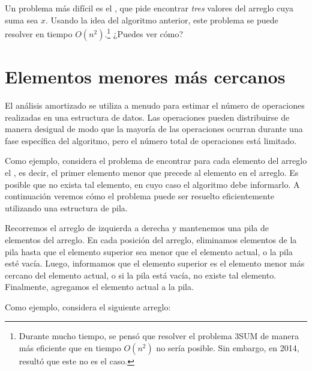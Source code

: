 Un problema más difícil es
el , que pide
encontrar \emph{tres} valores del arreglo
cuya suma sea $x$.
Usando la idea del algoritmo anterior,
este problema se puede resolver en tiempo $O(n^2)$.\footnote{Durante mucho tiempo,
    se pensó que resolver
    el problema 3SUM de manera más eficiente que en tiempo $O(n^2)$
    no sería posible.
    Sin embargo, en 2014, resultó \cite{gro14}
    que este no es el caso.}
¿Puedes ver cómo?

\section{Elementos menores más cercanos}


El análisis amortizado se utiliza a menudo para
estimar el número de operaciones
realizadas en una estructura de datos.
Las operaciones pueden distribuirse de manera desigual de modo que
la mayoría de las operaciones ocurran durante una
fase específica del algoritmo, pero el número total
de operaciones está limitado.

Como ejemplo, considera el problema
de encontrar para cada elemento del arreglo
el , es decir,
el primer elemento menor que precede al elemento
en el arreglo.
Es posible que no exista tal elemento,
en cuyo caso el algoritmo debe informarlo.
A continuación veremos cómo el problema puede ser
resuelto eficientemente utilizando una estructura de pila.

Recorremos el arreglo de izquierda a derecha
y mantenemos una pila de elementos del arreglo.
En cada posición del arreglo, eliminamos elementos de la pila
hasta que el elemento superior sea menor que el
elemento actual, o la pila esté vacía.
Luego, informamos que el elemento superior es
el elemento menor más cercano del elemento actual,
o si la pila está vacía, no existe tal elemento.
Finalmente, agregamos el elemento actual a la pila.

Como ejemplo, considera el siguiente arreglo:
\begin{center}
\end{center}

